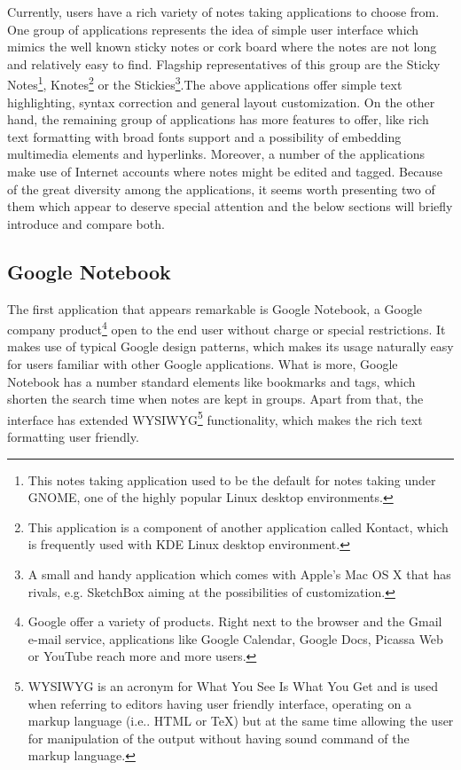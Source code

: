Currently, users have a rich variety of notes taking applications to choose from. One group of applications represents the idea of simple user interface which mimics the well known sticky notes or cork board where the notes are not long and relatively easy to find. Flagship representatives of this group are the Sticky Notes\footnote{This notes taking application used to be the default for notes taking under GNOME, one of the highly popular Linux desktop environments.}, Knotes\footnote{This application is a component of another application called Kontact, which is frequently used with KDE Linux desktop environment.} or the Stickies\footnote{A small and handy application which comes with Apple's Mac OS X that has rivals, e.g. SketchBox aiming at the possibilities of customization.}.The above applications offer simple text highlighting, syntax correction and general layout customization. On the other hand, the remaining group of applications has more features to offer, like rich text formatting with broad fonts support and a possibility of embedding multimedia elements and hyperlinks. Moreover, a number of the applications make use of Internet accounts where notes might be edited and tagged. Because of the great diversity among the applications, it seems worth presenting two of them which appear to deserve special attention and the below sections will briefly introduce and compare both.

\subsection{Google Notebook}\label{subsec:google_notebook}
The first application that appears remarkable is Google Notebook, a Google company product\footnote{Google offer a variety of products. Right next to the browser and the Gmail e-mail service, applications like Google Calendar, Google Docs, Picassa Web or YouTube reach more and more users.} open to the end user without charge or special restrictions. It makes use of typical Google design patterns, which makes its usage naturally easy for users familiar with other Google applications. What is more, Google Notebook has a number standard elements like bookmarks and tags, which shorten the search time when notes are kept in groups. Apart from that, the interface has extended WYSIWYG\footnote{WYSIWYG is an acronym for What You See Is What You Get and is used when referring to editors having user friendly interface, operating on a markup language (i.e.. HTML or \TeX) but at the same time allowing the user for manipulation of the output without having sound command of the markup language.} functionality, which makes the rich text formatting user friendly.

